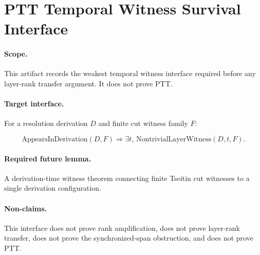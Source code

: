 \section{PTT Temporal Witness Survival Interface}

\paragraph{Scope.}
This artifact records the weakest temporal witness interface required before
any layer-rank transfer argument. It does not prove PTT.

\paragraph{Target interface.}
For a resolution derivation $D$ and finite cut witness family $F$:

\[
\mathrm{AppearsInDerivation}(D,F)
\Longrightarrow
\exists t,\,
\mathrm{NontrivialLayerWitness}(D,t,F).
\]

\paragraph{Required future lemma.}
A derivation-time witness theorem connecting finite Tseitin cut witnesses
to a single derivation configuration.

\paragraph{Non-claims.}
This interface does not prove rank amplification, does not prove layer-rank
transfer, does not prove the synchronized-span obstruction, and does not
prove PTT.

